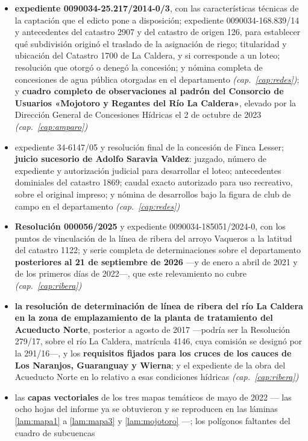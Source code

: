 \begin{itemize}[leftmargin=*]
\item \textbf{expediente 0090034-25.217/2014-0/3}, con las características técnicas de la captación que el edicto pone a disposición; expediente 0090034-168.839/14 y antecedentes del catastro 2907 y del catastro de origen 126, para establecer qué subdivisión originó el traslado de la asignación de riego; titularidad y ubicación del Catastro 1700 de La Caldera, y si corresponde a un loteo; resolución que otorgó o denegó la concesión; y nómina completa de concesiones de agua pública otorgadas en el departamento \textit{(cap.\ \ref{cap:redes})}; y \textbf{cuadro completo de observaciones al padrón del Consorcio de Usuarios «Mojotoro y Regantes del Río La Caldera»}, elevado por la Dirección General de Concesiones Hídricas el 2 de octubre de 2023 \textit{(cap.\ \ref{cap:amparo})}
\item expediente 34-6147/05 y resolución final de la concesión de Finca Lesser; \textbf{juicio sucesorio de Adolfo Saravia Valdez}: juzgado, número de expediente y autorización judicial para desarrollar el loteo; antecedentes dominiales del catastro 1869; caudal exacto autorizado para uso recreativo, sobre el original impreso; y nómina de desarrollos bajo la figura de club de campo en el departamento \textit{(cap.\ \ref{cap:redes})}
\item \textbf{Resolución 000056/2025} y expediente 0090034-185051/2024-0, con los puntos
de vinculación de la línea de ribera del arroyo Vaqueros a la latitud del catastro 1122; y
serie completa de determinaciones sobre el departamento \textbf{posteriores al 21 de septiembre de 2026} ---y de enero a abril de 2021 y de los primeros días de 2022---, que este
relevamiento no cubre \textit{(cap.\ \ref{cap:ribera})}
\item \textbf{la resolución de determinación de línea de ribera del río La Caldera en la
zona de emplazamiento de la planta de tratamiento del Acueducto Norte}, posterior a agosto de
2017 ---podría ser la Resolución 279/17, sobre el río La Caldera, matrícula 4146, cuya comisión se designó por la 291/16---, y los \textbf{requisitos fijados para los cruces de los cauces de Los Naranjos,
Guaranguay y Wierna}; y el expediente de la obra del Acueducto Norte en lo relativo a esas
condiciones hídricas \textit{(cap.\ \ref{cap:ribera})}
\item las \textbf{capas vectoriales} de los tres mapas temáticos de mayo de 2022 --- las
ocho hojas del informe ya se obtuvieron y se reproducen en las láminas \ref{lam:mapa1} a
\ref{lam:mapa3} y \ref{lam:mojotoro} ---; los polígonos faltantes del cuadro de subcuencas

\end{itemize}

